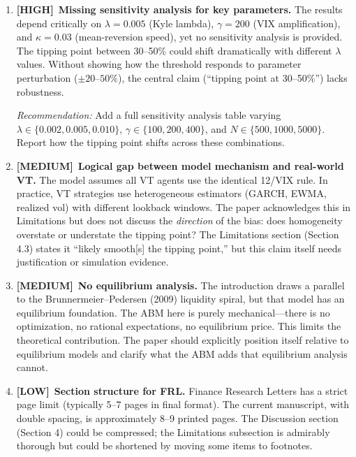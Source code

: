 \documentclass[12pt,a4paper]{article}
\newcommand{\HIGH}{\textbf{\textcolor{highred}{[HIGH]}}}
\newcommand{\MEDIUM}{\textbf{\textcolor{medorange}{[MEDIUM]}}}
\newcommand{\LOW}{\textbf{\textcolor{lowgreen}{[LOW]}}}
\begin{document}
\begin{enumerate}[leftmargin=2em]

\item \HIGH\ \textbf{Missing sensitivity analysis for key parameters.} The results depend critically on $\lambda = 0.005$ (Kyle lambda), $\gamma = 200$ (VIX amplification), and $\kappa = 0.03$ (mean-reversion speed), yet no sensitivity analysis is provided. The tipping point between 30--50\% could shift dramatically with different $\lambda$ values. Without showing how the threshold responds to parameter perturbation ($\pm 20$--$50\%$), the central claim (``tipping point at 30--50\%'') lacks robustness.

\textit{Recommendation:} Add a full sensitivity analysis table varying $\lambda \in \{0.002, 0.005, 0.010\}$, $\gamma \in \{100, 200, 400\}$, and $N \in \{500, 1000, 5000\}$. Report how the tipping point shifts across these combinations.

\item \MEDIUM\ \textbf{Logical gap between model mechanism and real-world VT.} The model assumes all VT agents use the identical 12/VIX rule. In practice, VT strategies use heterogeneous estimators (GARCH, EWMA, realized vol) with different lookback windows. The paper acknowledges this in Limitations but does not discuss the \emph{direction} of the bias: does homogeneity overstate or understate the tipping point? The Limitations section (Section 4.3) states it ``likely smooth[s] the tipping point,'' but this claim itself needs justification or simulation evidence.

\item \MEDIUM\ \textbf{No equilibrium analysis.} The introduction draws a parallel to the Brunnermeier--Pedersen (2009) liquidity spiral, but that model has an equilibrium foundation. The ABM here is purely mechanical---there is no optimization, no rational expectations, no equilibrium price. This limits the theoretical contribution. The paper should explicitly position itself relative to equilibrium models and clarify what the ABM adds that equilibrium analysis cannot.

\item \LOW\ \textbf{Section structure for FRL.} Finance Research Letters has a strict page limit (typically 5--7 pages in final format). The current manuscript, with double spacing, is approximately 8--9 printed pages. The Discussion section (Section 4) could be compressed; the Limitations subsection is admirably thorough but could be shortened by moving some items to footnotes.

\end{enumerate}
\end{document}
